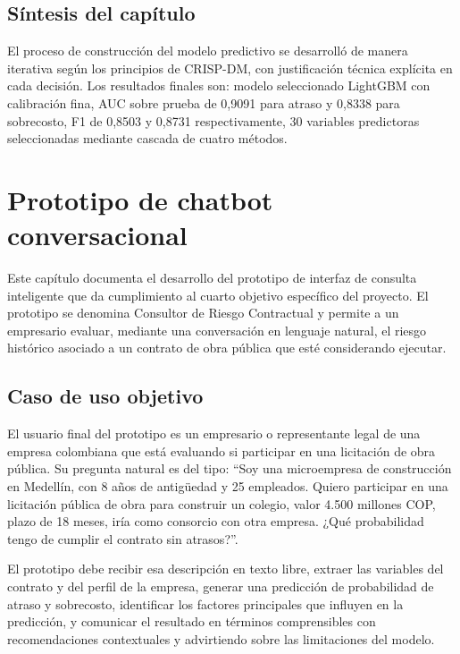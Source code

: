 \documentclass[12pt,letterpaper,oneside]{report}
\begin{document}
\section{Síntesis del capítulo}

El proceso de construcción del modelo predictivo se desarrolló de manera
iterativa según los principios de CRISP-DM, con justificación técnica
explícita en cada decisión. Los resultados finales son: modelo seleccionado
LightGBM con calibración fina, AUC sobre prueba de 0,9091 para atraso y
0,8338 para sobrecosto, F1 de 0,8503 y 0,8731 respectivamente, 30 variables
predictoras seleccionadas mediante cascada de cuatro métodos.

\chapter{Prototipo de chatbot conversacional}
\label{cap:chatbot}

Este capítulo documenta el desarrollo del prototipo de interfaz de consulta
inteligente que da cumplimiento al cuarto objetivo específico del proyecto.
El prototipo se denomina Consultor de Riesgo Contractual y permite a un
empresario evaluar, mediante una conversación en lenguaje natural, el riesgo
histórico asociado a un contrato de obra pública que esté considerando
ejecutar.

\section{Caso de uso objetivo}

El usuario final del prototipo es un empresario o representante legal de una
empresa colombiana que está evaluando si participar en una licitación de obra
pública. Su pregunta natural es del tipo: ``Soy una microempresa de
construcción en Medellín, con 8 años de antigüedad y 25 empleados. Quiero
participar en una licitación pública de obra para construir un colegio, valor
4.500 millones COP, plazo de 18 meses, iría como consorcio con otra empresa.
¿Qué probabilidad tengo de cumplir el contrato sin atrasos?''.

El prototipo debe recibir esa descripción en texto libre, extraer las
variables del contrato y del perfil de la empresa, generar una predicción de
probabilidad de atraso y sobrecosto, identificar los factores principales que
influyen en la predicción, y comunicar el resultado en términos comprensibles
con recomendaciones contextuales y advirtiendo sobre las limitaciones del
modelo.
\end{document}
